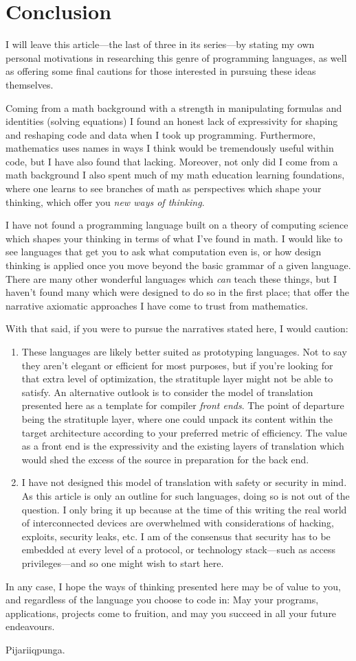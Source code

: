 \documentclass[twoside]{article}
\begin{document}
\section*{Conclusion}

I will leave this article---the last of three in its series---by stating my own personal motivations in researching
this genre of programming languages, as well as offering some final cautions for those interested in pursuing these
ideas themselves.

Coming from a math background with a strength in manipulating formulas and identities (solving equations) I found
an honest lack of expressivity for shaping and reshaping code and data when I took up programming. Furthermore,
mathematics uses names in ways I think would be tremendously useful within code, but I have also found that lacking.
Moreover, not only did I come from a math background I also spent much of my math education learning foundations,
where one learns to see branches of math as perspectives which shape your thinking, which offer you
\emph{new ways of thinking}.

I have not found a programming language built on a theory of computing science which shapes your thinking in terms
of what I've found in math. I would like to see languages that get you to ask what computation even is, or how design
thinking is applied once you move beyond the basic grammar of a given language. There are many other wonderful languages
which \emph{can} teach these things, but I haven't found many which were designed to do so in the first place; that offer
the narrative axiomatic approaches I have come to trust from mathematics.

With that said, if you were to pursue the narratives stated here, I would caution:

\begin{enumerate}
\item These languages are likely better suited as prototyping languages. Not to say they aren't elegant or efficient
      for most purposes, but if you're looking for that extra level of optimization, the stratituple layer might
      not be able to satisfy. An alternative outlook is to consider the model of translation presented here
      as a template for compiler \emph{front ends}. The point of departure being the stratituple layer, where one
      could unpack its content within the target architecture according to your preferred metric of efficiency.
      The value as a front end is the expressivity and the existing layers of translation which would shed the
      excess of the source in preparation for the back end.
\item I have not designed this model of translation with safety or security in mind. As this article is only an
      outline for such languages, doing so is not out of the question. I only bring it up because at the time
      of this writing the real world of interconnected devices are overwhelmed with considerations of hacking,
      exploits, security leaks, etc. I am of the consensus that security has to be embedded at every level
      of a protocol, or technology stack---such as access privileges---and so one might wish to start here.
\end{enumerate}

In any case, I hope the ways of thinking presented here may be of value to you, and regardless of the language
you choose to code in: May your programs, applications, projects come to fruition, and may you succeed in all
your future endeavours.

Pijariiqpunga.
\end{document}
